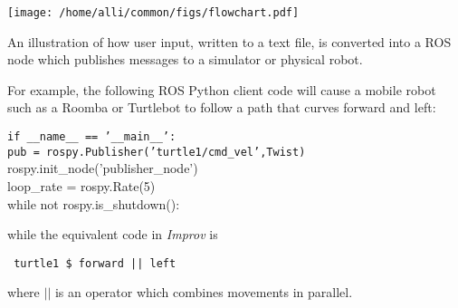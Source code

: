 \documentclass[sigchi-a]{acmart}
\begin{document}
\begin{marginfigure}
\centering
\texttt{[image: /home/alli/common/figs/flowchart.pdf]}
\caption{An illustration of how user input, written to a text file, is
converted into a ROS node which publishes messages to a simulator or physical 
robot.
\label{flowchart}}
\end{marginfigure}

\begin{sidebar}
For example, the following ROS Python client code will cause a
mobile robot such as a Roomba or Turtlebot to follow a path that curves
forward and left:
\end{sidebar}

\begin{margintable}
\begin{tabular}[l]
\texttt{if \_\_name\_\_ == '\_\_main\_\_':} \\ 
\texttt{pub = rospy.Publisher('turtle1/cmd\_vel',Twist)} \\ 
rospy.init\_node('publisher\_node') \\ 
loop\_rate = rospy.Rate(5) \\ 
while not rospy.is\_shutdown(): \\ 
\end{tabular}
\end{margintable}

\begin{sidebar}
while the equivalent code in \emph{Improv} is

\texttt{
turtle1 \$ forward || left
}

where $||$ is an operator which combines movements in parallel.
\end{sidebar}


%
%



\maketitle
\end{document}
